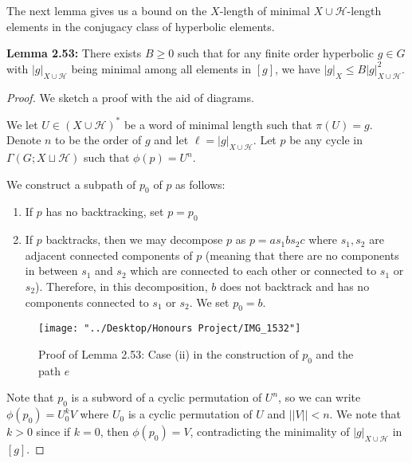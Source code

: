 \documentclass[12pt]{article}
\newcommand{\vs}{\vskip10pt}
\begin{document}
	The next lemma gives us a bound on the $X$-length of minimal $X \cup \mathcal{H}$-length elements in the conjugacy class of hyperbolic elements. 
	
	\vs 
	
	\textbf{Lemma 2.53: } There exists $B \geq 0$ such that for any finite order hyperbolic $g \in G$ with $\vert g \vert_{X \cup \mathcal{H}}$ being minimal among all elements in $[g]$, we have $\vert g \vert_X \leq B \vert g \vert_{X \cup \mathcal{H}}^2$. 
	
	\begin{proof}
		
		We sketch a proof with the aid of diagrams. 
		
		\vs 
		
		We let $U \in (X \cup \mathcal{H})^*$ be a word of minimal length such that $\pi(U) = g$. Denote $n$ to be the order of $g$ and let $\ell = \vert g \vert_{X \cup \mathcal{H}}$. Let $p$ be any cycle in $\Gamma(G; X \sqcup \mathcal{H})$ such that $\phi(p) = U^n$. 
		
		\vs 
		
		We construct a subpath of $p_0$ of $p$ as follows: 
		
		\begin{enumerate}[label = (\roman*)]
			\item If $p$ has no backtracking, set $p = p_0$
			\item If $p$ backtracks, then we may decompose $p$ as $p = a s_1 b s_2 c$ where $s_1, s_2$ are adjacent connected components of $p$ (meaning that there are no components in between $s_1$ and $s_2$ which are connected to each other or connected to $s_1$ or $s_2$). Therefore, in this decomposition, $b$ does not backtrack and has no components connected to $s_1$ or $s_2$. We set $p_0 = b$. 
		\end{enumerate}
		
\begin{figure} [H]
	\centering
	\texttt{[image: "../Desktop/Honours Project/IMG\_1532"]}
	\caption{Proof of Lemma 2.53: Case (ii) in the construction of $p_0$ and the path $e$}
	\label{fig:img1532}
\end{figure}
		
		\vs
		
		Note that $p_0$ is a subword of a cyclic permutation of $U^n$, so we can write $\phi(p_0) = U_0^k V$ where $U_0$ is a cyclic permutation of $U$ and $\vert \vert V \vert \vert < n$. We note that $k > 0$ since if $k = 0$, then $\phi(p_0) = V$, contradicting the minimality of $\vert g \vert_{X \cup \mathcal{H}}$ in $[g]$. 
		

\end{proof}
\end{document}

